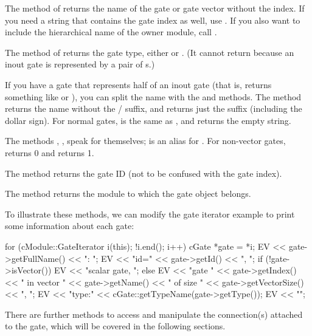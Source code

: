 The  method of  returns the name of the
gate or gate vector without the index. If you need a string that contains the gate index
as well, use . If you also want to
include the hierarchical name of the owner module, call .

The  method of  returns the gate type,
either  or . (It cannot return
 because an inout gate is represented by a pair
of s.)

If you have a gate that represents half of an inout gate (that is,
 returns something like  or ), you
can split the name with the  and
 methods. The  method returns the
name without the / suffix, and 
returns just the suffix (including the dollar sign). For normal gates,
 is the same as , and
 returns the empty string.

The methods , ,  speak
for themselves;  is an alias for . For
non-vector gates,  returns 0 and 
returns 1.

The  method returns the gate ID (not to be confused
with the gate index).

The  method returns the module to which the gate object
belongs.

To illustrate these methods, we can modify the gate iterator example
to print some information about each gate:

\begin{cpp}
for (cModule::GateIterator i(this); !i.end(); i++) {
    cGate *gate = *i;
    EV << gate->getFullName() << ": ";
    EV << "id=" << gate->getId() << ", ";
    if (!gate->isVector())
        EV << "scalar gate, ";
    else
        EV << "gate " << gate->getIndex()
           << " in vector " << gate->getName()
           << " of size " << gate->getVectorSize() << ", ";
    EV << "type:" << cGate::getTypeName(gate->getType());
    EV << "\n";
}
\end{cpp}

There are further  methods to access and manipulate
the connection(s) attached to the gate, which will be covered in the
following sections.


